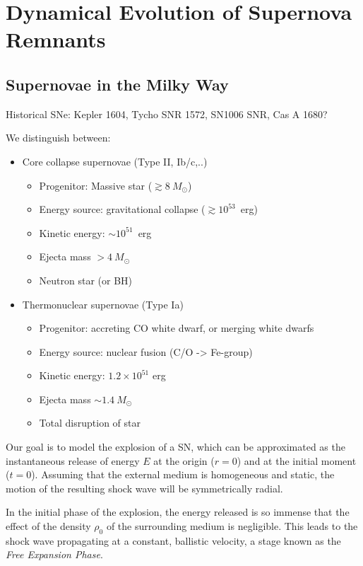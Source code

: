 \section{Dynamical Evolution of Supernova Remnants}

\subsection{Supernovae in the Milky Way}

Historical SNe: Kepler 1604, {\color{red}Tycho SNR 1572}, SN1006 SNR, Cas A 1680?

We distinguish between: 
%
\begin{itemize}
\item Core collapse supernovae (Type II, Ib/c,..)
\begin{itemize}
\item Progenitor: Massive star (\( \gtrsim 8~M_\odot \))
\item Energy source: gravitational collapse (\( \gtrsim 10^{53} \)~erg) 
\item Kinetic energy: \( \sim 10^{51} \)~erg
\item Ejecta mass \( >4~M_\odot \)  
\item Neutron star (or BH)
\end{itemize}
\item Thermonuclear supernovae (Type Ia)
\begin{itemize}
\item Progenitor: accreting CO white dwarf, or merging white dwarfs 
\item Energy source: nuclear fusion (C/O -> Fe-group)
\item Kinetic energy: \( 1.2 \times 10^{51} \) erg
\item Ejecta mass \( \sim 1.4~M_\odot \)
\item Total disruption of star
\end{itemize}
\end{itemize}

Our goal is to model the explosion of a SN, which can be approximated as the instantaneous release of energy \( E \) at the origin (\( r = 0 \)) and at the initial moment (\( t = 0 \)). Assuming that the external medium is homogeneous and static, the motion of the resulting shock wave will be symmetrically radial.

In the initial phase of the explosion, the energy released is so immense that the effect of the density \( \rho_0 \) of the surrounding medium is negligible. 
%
This leads to the shock wave propagating at a constant, ballistic velocity, a stage known as the \emph{Free Expansion Phase}.

